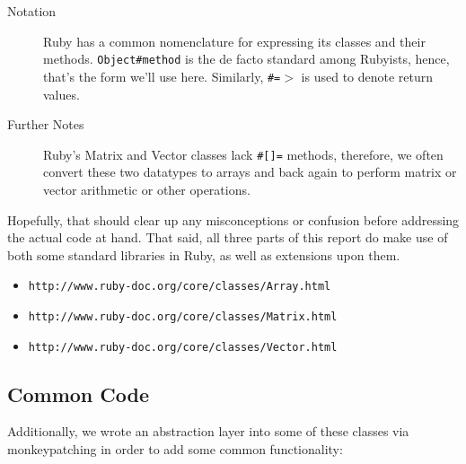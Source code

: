 \documentclass[letterpaper,12pt]{article}
\begin{document}
\begin{description}
\item[Notation]

  Ruby has a common nomenclature for expressing its classes and their methods.
  \texttt{Object\#method} is the de facto standard among Rubyists, hence, that's the form
  we'll use here.
  Similarly, \texttt{\#=$>$} is used to denote return values.

\item[Further Notes]

  Ruby's Matrix and Vector classes lack \texttt{\#[]=} methods, therefore, we often convert
  these two datatypes to arrays and back again to perform matrix or vector arithmetic
  or other operations.

\end{description}

Hopefully, that should clear up any misconceptions or confusion before
addressing the actual code at hand.
That said, all three parts of this report do make use of both some standard
libraries in Ruby, as well as extensions upon them.

\begin{itemize}

\item \texttt{http://www.ruby-doc.org/core/classes/Array.html}
\item \texttt{http://www.ruby-doc.org/core/classes/Matrix.html}
\item \texttt{http://www.ruby-doc.org/core/classes/Vector.html}

\end{itemize}

\subsection{Common Code}

Additionally, we wrote an abstraction layer into some of these classes via
monkeypatching in order to add some common functionality:
\end{document}
